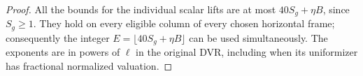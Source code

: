 \begin{proof}
All the bounds for the individual scalar lifts are at most
\(40S_g+\eta B\), since \(S_g\ge1\).
They hold on every eligible column of every chosen horizontal
frame; consequently the integer
\(E=\lfloor40S_g+\eta B\rfloor\) can be used simultaneously.
The exponents are in powers of \(\ell\) in the original DVR,
including when its uniformizer has fractional normalized valuation.
\end{proof}

